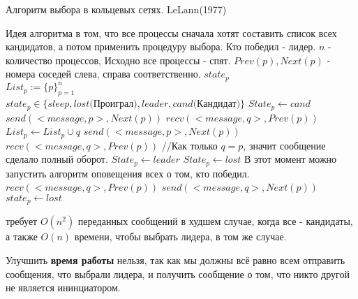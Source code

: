 \begin{algorithm}
\caption{Алгоритм выбора в кольцевых сетях. LeLann(1977)}
\label{algLeLann}
\begin{algorithmic}
\State Идея алгоритма в том, что все процессы сначала хотят составить список всех кандидатов, а потом применить процедуру выбора. Кто победил - лидер. 
\Require $n$ - количество процессов, Исходно все процессы - спят. $Prev(p), Next(p)$ - номера соседей слева, справа соответственно.
\Ensure $state_p$\\
$List_p:=\{p\}_{p=1}^n$ \\ 
$state_p \in \{sleep, lost\text{(Проиграл)}, leader, cand\text{(Кандидат)}\}$ 
 
    \State $State_p \gets cand$
    \State $send(<message, p>, Next(p))$ 
    \State $recv(<message, q>, Prev(p))$ 
     
        \State $List_p \gets List_p \cup {q}$
        \State $send(<message, p>, Next(p))$ 
        \State $recv(<message, q>, Prev(p))$ 
        \State //Как только $q = p$, значит сообщение сделало полный оборот.
    \EndWhile
     
        \State $State_p \gets leader$
    \Else 
        \State $State_p \gets lost$
    \EndIf
    \State В этот момент можно запустить алгоритм оповещения всех о том, кто победил.
\Else[Не инициаторы] 
        \State $recv(<message, q>, Prev(p))$ 
        \State $send(<message, q>, Next(p))$ 
            \State $state_p \gets lost$
        \EndIf
    \EndWhile
\EndIf 
\end{algorithmic}
\end{algorithm}
 требует $O(n^2)$ переданных сообщений в худшем случае, когда все - кандидаты, а также $O(n)$ времени, чтобы выбрать лидера, в том же случае.

Улучшить \textbf{время работы} нельзя, так как мы должны всё равно всем отправить сообщения, что выбрали лидера, и получить сообщение о том, что никто другой не является ининциатором.

